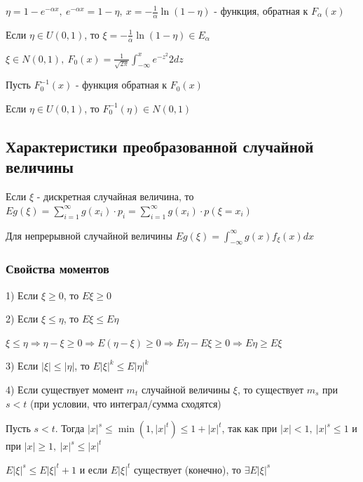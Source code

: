\documentclass[12pt]{article}
\begin{document}
    $\eta = 1 - e^{-\alpha x}, \ e^{-\alpha x} = 1 - \eta, \ x = -\frac{1}{\alpha} \ln(1 - \eta)$ - функция, обратная к $F_\alpha(x)$

    Если $\eta \in U(0, 1)$, то $\xi = -\frac{1}{\alpha} \ln(1 - \eta) \in E_\alpha$

     $\xi \in N(0, 1), \ F_0(x) = \frac{1}{\sqrt{2\pi}} \int_{-\infty}^x e^{-z^2}{2} dz$

    Пусть $F_0^{-1}(x)$ - функция обратная к $F_0(x)$

    Если $\eta \in U(0, 1)$, то $F_0^{-1}(\eta) \in N(0, 1)$

    \subsection{Характеристики преобразованной случайной величины}

    \begin{MyTheorem}
        \Ths Если $\xi$ - дискретная случайная величина, то $Eg(\xi) = \sum_{i = 1}^\infty g(x_i) \cdot p_i = \sum_{i = 1}^\infty g(x_i) \cdot p(\xi = x_i)$

        Для непрерывной случайной величины $Eg(\xi) = \int_{-\infty}^{\infty} g(x) f_\xi(x) dx$
    \end{MyTheorem}

    \subsubsection{Свойства моментов}

    1) Если $\xi \geq 0$, то $E\xi \geq 0$

    2) Если $\xi \leq \eta$, то $E\xi \leq E\eta$

    \begin{MyProof}
        $\xi \leq \eta \Longrightarrow \eta - \xi \geq 0 \Longrightarrow E(\eta - \xi) \geq 0 \Longrightarrow E\eta - E\xi \geq 0 \Longrightarrow E\eta \geq E\xi$
    \end{MyProof}

    3) Если $|\xi| \leq |\eta|$, то $E|\xi|^k \leq E|\eta|^k$

    4) Если существует момент $m_t$ случайной величины $\xi$, то существует $m_s$ при $s < t$ (при условии, что интеграл/сумма сходятся)

    \begin{MyProof}
        Пусть $s < t$. Тогда $|x|^s \leq \min(1, |x|^t) \leq 1 + |x|^t$, так как при $|x| < 1, \ |x|^s \leq 1$ и при $|x| \geq 1, \ |x|^s \leq |x|^t$
    
        $E|\xi|^s \leq E|\xi|^t + 1$ и если $E|\xi|^t$ существует (конечно), то $\exists E|\xi|^s$
    
    \end{MyProof}
\end{document}
